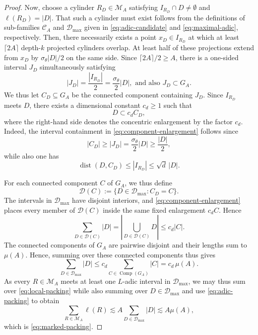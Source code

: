 \documentclass[10pt,a4paper]{amsart}
\begin{document}
\begin{proof}
Now, choose a cylinder $R_D \in \mathscr{M}_A$ satisfying $I_{R_D} \cap D \neq \emptyset$ and $\ell (R_D) = |D|$. That such a cylinder must exist follows from the definitions of sub-families $\mathcal{C}_A$ and $\mathcal{D}_{\max}$ given in \eqref{eq:adic-candidate} and \eqref{eq:maximal-adic}, respectively. Then, there necessarily exists a point $x_D\in I_{R_D}$ at which at least $\lceil2A\rceil$ depth-$k$ projected cylinders overlap.  At least half of these projections extend from $x_D$ by $\sigma_\theta|D|/2$ on the same side.  Since
$\lceil2A\rceil/2\geq A$, there is a one-sided interval $J_D$ simultaneously satisfying
\begin{equation}\label{eq:charge-interval}
 |J_D|= \frac{|I_{R_D}|}{2}=\frac{\sigma_\theta}{2} \lvert D \rvert, \textrm{ and also }
 J_D\subset G_A.
\end{equation}
We thus let $C_D \subseteq G_A$ be the connected component containing $J_D$.  Since $I_{R_D}$ meets $D$, there exists a dimensional constant $c_d \geq 1$ such that
\begin{equation}\label{eq:component-enlargement}
 D\subset c_d C_D,
\end{equation}
where the right-hand side denotes the concentric enlargement by the factor $c_d$.  Indeed, the interval containment in \eqref{eq:component-enlargement} follows since
$$
 |C_D|\geq|J_D|=\frac{\sigma_\theta}{2}|D|\geq\frac{|D|}{2},
$$
while also one has
$$
\operatorname{dist}(D,C_D)\leq |I_{R_D}|\leq\sqrt d\,|D|.
$$


For each connected component $C$ of $G_A$, we thus define
$$
 \mathcal D(C):=\{D\in\mathcal D_{\max}:C_D=C\}.
$$
The intervals in $\mathcal D_{\max}$ have disjoint interiors, and
\eqref{eq:component-enlargement} places every member of $\mathcal D(C)$ inside
the same fixed enlargement $c_dC$.  Hence
$$
 \sum_{D\in\mathcal D(C)}|D|
 =\left|\bigcup_{D\in\mathcal D(C)}D\right|
 \leq c_d |C|.
$$
The connected components of $G_A$ are pairwise disjoint and their lengths sum to $\mu(A)$. Hence, summing over these connected components thus gives
\begin{equation}\label{eq:adic-packing}
 \sum_{D\in\mathcal D_{\max}}|D|
 \leq c_d 
 \sum_{C\in\operatorname{Comp}(G_A)}|C|
 =c_d \, \mu(A).
\end{equation}
As every $R\in\mathscr M_A$ meets at least one $L$-adic interval in $\mathcal D_{\max}$, we may thus sum over \eqref{eq:local-packing} while also summing over $D\in\mathcal D_{\max}$ and use \eqref{eq:adic-packing} to obtain
$$
 \sum_{R\in\mathscr M_A}\ell(R)
 \lesssim A\sum_{D\in\mathcal D_{\max}}|D|
 \lesssim A\mu(A),
$$
which is \eqref{eq:marked-packing}.


\end{proof}
\end{document}
